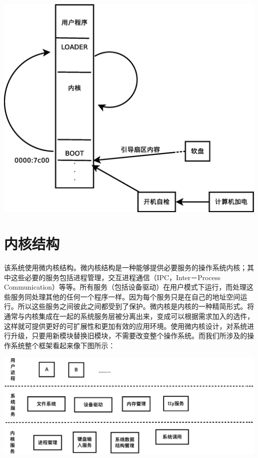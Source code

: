 \documentclass[UTF8,nofonts]{ctexrep}
\begin{document}
\begin{center}
\label{80386}
\includegraphics[scale=0.4]{start.eps}
\end{center}

\section{内核结构}
该系统使用微内核结构。微内核结构是一种能够提供必要服务的操作系统内核；其中这些必要的服务包括进程管理，交互进程通信（IPC，Inter－Process Communication）等等。所有服务（包括设备驱动）在用户模式下运行，而处理这些服务同处理其他的任何一个程序一样。因为每个服务只是在自己的地址空间运行。所以这些服务之间彼此之间都受到了保护。微内核是内核的一种精简形式。将通常与内核集成在一起的系统服务层被分离出来，变成可以根据需求加入的选件，这样就可提供更好的可扩展性和更加有效的应用环境。使用微内核设计，对系统进行升级，只要用新模块替换旧模块，不需要改变整个操作系统。而我们所涉及的操作系统整个框架看起来像下图所示：
\begin{center}
\includegraphics[scale=0.4]{osstruct.eps}
\end{center}
\end{document}
